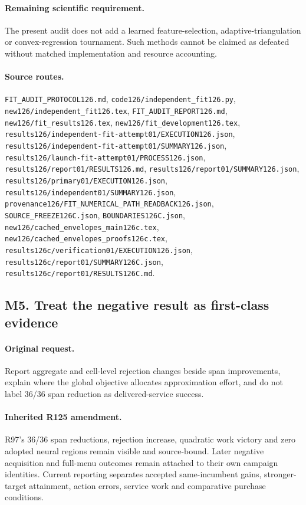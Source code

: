 \paragraph{Remaining scientific requirement.} The present audit does not add a learned feature-selection, adaptive-triangulation or convex-regression tournament. Such methods cannot be claimed as defeated without matched implementation and resource accounting.

\paragraph{Source routes.} \nolinkurl{FIT_AUDIT_PROTOCOL126.md}, \nolinkurl{code126/independent_fit126.py}, \nolinkurl{new126/independent_fit126.tex}, \nolinkurl{FIT_AUDIT_REPORT126.md}, \nolinkurl{new126/fit_results126.tex}, \nolinkurl{new126/fit_development126.tex}, \nolinkurl{results126/independent-fit-attempt01/EXECUTION126.json}, \nolinkurl{results126/independent-fit-attempt01/SUMMARY126.json}, \nolinkurl{results126/launch-fit-attempt01/PROCESS126.json}, \nolinkurl{results126/report01/RESULTS126.md}, \nolinkurl{results126/report01/SUMMARY126.json}, \nolinkurl{results126/primary01/EXECUTION126.json}, \nolinkurl{results126/independent01/SUMMARY126.json}, \nolinkurl{provenance126/FIT_NUMERICAL_PATH_READBACK126.json}, \nolinkurl{SOURCE_FREEZE126C.json}, \nolinkurl{BOUNDARIES126C.json}, \nolinkurl{new126/cached_envelopes_main126c.tex}, \nolinkurl{new126/cached_envelopes_proofs126c.tex}, \nolinkurl{results126c/verification01/EXECUTION126.json}, \nolinkurl{results126c/report01/SUMMARY126C.json}, \nolinkurl{results126c/report01/RESULTS126C.md}.

\subsection*{M5. Treat the negative result as first-class evidence}
\paragraph{Original request.} Report aggregate and cell-level rejection changes beside span improvements, explain where the global objective allocates approximation effort, and do not label 36/36 span reduction as delivered-service success.

\paragraph{Inherited R125 amendment.} R97's 36/36 span reductions, rejection increase, quadratic work victory and zero adopted neural regions remain visible and source-bound. Later negative acquisition and full-menu outcomes remain attached to their own campaign identities. Current reporting separates accepted same-incumbent gains, stronger-target attainment, action errors, service work and comparative purchase conditions.

